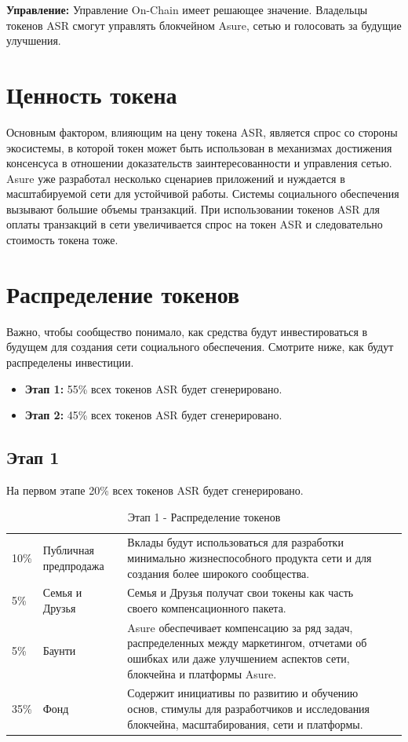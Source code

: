 \textbf{Управление:}
Управление On-Chain имеет решающее значение. Владельцы токенов ASR смогут управлять блокчейном Asure, сетью и голосовать за будущие улучшения.
\newline

\section{Ценность токена}
Основным фактором, влияющим на цену токена ASR, является спрос со стороны экосистемы, в которой токен может быть использован в механизмах достижения консенсуса в отношении доказательств заинтересованности и управления сетью. Asure уже разработал несколько сценариев приложений и нуждается в масштабируемой сети для устойчивой работы. Системы социального обеспечения вызывают большие объемы транзакций. При использовании токенов ASR для оплаты транзакций в сети увеличивается спрос на токен ASR и следовательно стоимость токена тоже.


\section{Распределение токенов}

Важно, чтобы сообщество понимало, как средства будут инвестироваться в будущем для создания сети социального обеспечения. Смотрите ниже, как будут распределены инвестиции.

\begin{itemize}
\item \textbf{Этап 1:} 55\% всех токенов ASR будет сгенерировано.
\item \textbf{Этап 2:} 45\% всех токенов ASR будет сгенерировано.
\end{itemize}

\newpage \subsection{Этап 1}

На первом этапе 20\% всех токенов ASR будет сгенерировано.

\begin{table}[H]
\begin{tabular}{llp{}l}
  10\% & Публичная предпродажа & Вклады будут использоваться для разработки минимально жизнеспособного продукта сети и для создания более широкого сообщества.\\
  5\% & Семья и Друзья & Семья и Друзья получат свои токены как часть своего компенсационного пакета.\\
  5\% & Баунти & Asure обеспечивает компенсацию за ряд задач, распределенных между маркетингом, отчетами об ошибках или даже улучшением аспектов сети, блокчейна и платформы Asure.\\
  35\% & Фонд & Содержит инициативы по развитию и обучению основ, стимулы для разработчиков и исследования блокчейна, масштабирования, сети и платформы.
\end{tabular}
\caption{\label{tab:table-name} Этап 1 - Распределение токенов}
\end{table}

